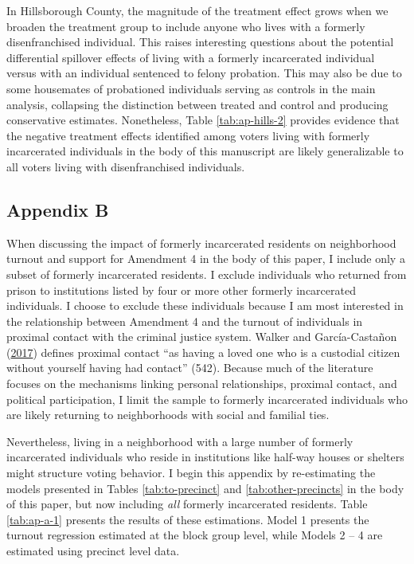 \documentclass[
  12pt,
]{article}
\begin{document}
In Hillsborough County, the magnitude of the treatment effect grows when we broaden the treatment group to include anyone who lives with a formerly disenfranchised individual. This raises interesting questions about the potential differential spillover effects of living with a formerly incarcerated individual versus with an individual sentenced to felony probation. This may also be due to some housemates of probationed individuals serving as controls in the main analysis, collapsing the distinction between treated and control and producing conservative estimates. Nonetheless, Table \ref{tab:ap-hills-2} provides evidence that the negative treatment effects identified among voters living with formerly incarcerated individuals in the body of this manuscript are likely generalizable to all voters living with disenfranchised individuals.

\newpage

\hypertarget{appendix-b}{%
\subsection*{Appendix B}\label{appendix-b}}

When discussing the impact of formerly incarcerated residents on neighborhood turnout and support for Amendment 4 in the body of this paper, I include only a subset of formerly incarcerated residents. I exclude individuals who returned from prison to institutions listed by four or more other formerly incarcerated individuals. I choose to exclude these individuals because I am most interested in the relationship between Amendment 4 and the turnout of individuals in proximal contact with the criminal justice system. Walker and García-Castañon (\protect\hyperlink{ref-Walker2017}{2017}) defines proximal contact ``as having a loved one who is a custodial citizen without yourself having had contact'' (542). Because much of the literature focuses on the mechanisms linking personal relationships, proximal contact, and political participation, I limit the sample to formerly incarcerated individuals who are likely returning to neighborhoods with social and familial ties.

Nevertheless, living in a neighborhood with a large number of formerly incarcerated individuals who reside in institutions like half-way houses or shelters might structure voting behavior. I begin this appendix by re-estimating the models presented in Tables \ref{tab:to-precinct} and \ref{tab:other-precincts} in the body of this paper, but now including \emph{all} formerly incarcerated residents. Table \ref{tab:ap-a-1} presents the results of these estimations. Model 1 presents the turnout regression estimated at the block group level, while Models 2 -- 4 are estimated using precinct level data.
\end{document}
